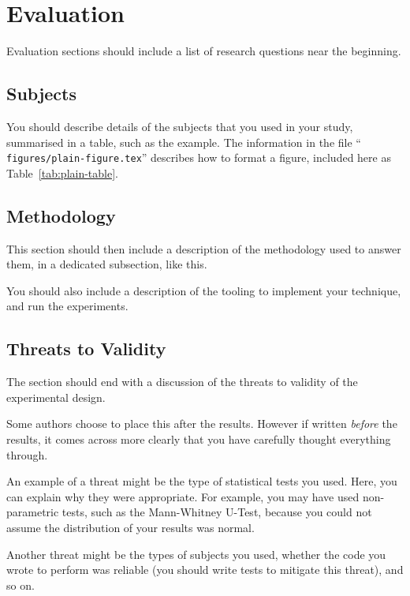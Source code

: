 \section{Evaluation}
\label{sec:evaluation}

Evaluation sections should include a list of research questions near the
beginning.

\subsection{Subjects}
\label{sec:subjects}

You should describe details of the subjects that you used in your study,
summarised in a table, such as the example. The information in the file ``{\tt
figures/plain-figure.tex}'' describes how to format a figure, included here as
Table~\ref{tab:plain-table}.

\subsection{Methodology}
\label{sec:methodology}

This section should then include a description of the methodology used to answer
them, in a dedicated subsection, like this.

You should also include a description of the tooling to implement your
technique, and run the experiments.

\subsection{Threats to Validity}
\label{sec:threats-to-validity}

The section should end with a discussion of the threats to validity of the
experimental design.

Some authors choose to place this after the results. However if written {\em
before} the results, it comes across more clearly that you have carefully
thought everything through.

An example of a threat might be the type of statistical tests you used. Here,
you can explain why they were appropriate. For example, you may have used
non-parametric tests, such as the Mann-Whitney U-Test, because you could not
assume the distribution of your results was normal.

Another threat might be the types of subjects you used, whether the code you
wrote to perform was reliable (you should write tests to mitigate this threat),
and so on.
